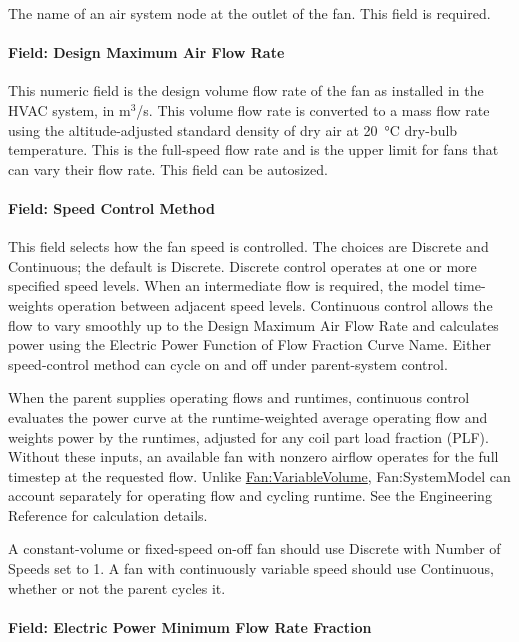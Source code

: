 The name of an air system node at the outlet of the fan. This field is required.

\paragraph{Field: Design Maximum Air Flow Rate}\label{field-design-air-flow-fansysmodel}

This numeric field is the design volume flow rate of the fan as installed in the HVAC system, in m\(^{3}\)/s. This volume flow rate is converted to a mass flow rate using the altitude-adjusted standard density of dry air at \SI{20}{\celsius} dry-bulb temperature. This is the full-speed flow rate and is the upper limit for fans that can vary their flow rate. This field can be autosized.

\paragraph{Field: Speed Control Method}\label{field-speed-method-fansysmodel}

This field selects how the fan speed is controlled. The choices are Discrete and Continuous; the default is Discrete. Discrete control operates at one or more specified speed levels. When an intermediate flow is required, the model time-weights operation between adjacent speed levels. Continuous control allows the flow to vary smoothly up to the Design Maximum Air Flow Rate and calculates power using the Electric Power Function of Flow Fraction Curve Name. Either speed-control method can cycle on and off under parent-system control.

When the parent supplies operating flows and runtimes, continuous control evaluates the power curve at the runtime-weighted average operating flow and weights power by the runtimes, adjusted for any coil part load fraction (PLF). Without these inputs, an available fan with nonzero airflow operates for the full timestep at the requested flow. Unlike \hyperref[fanvariablevolume]{Fan:VariableVolume}, Fan:SystemModel can account separately for operating flow and cycling runtime. See the Engineering Reference for calculation details.

A constant-volume or fixed-speed on-off fan should use Discrete with Number of Speeds set to 1. A fan with continuously variable speed should use Continuous, whether or not the parent cycles it.

\paragraph{Field: Electric Power Minimum Flow Rate Fraction}\label{field-power-min-flow-fraction-fansysmodel}

